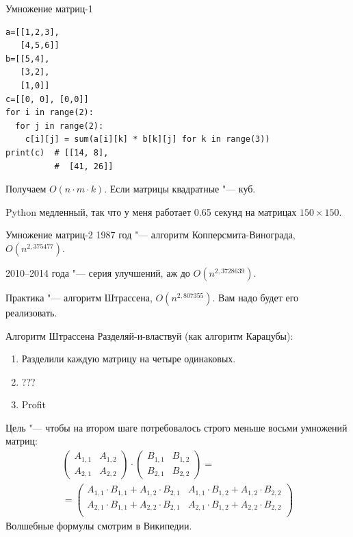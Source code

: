 \documentclass[utf8,xcolor=table]{beamer}
\begin{document}
\begin{frame}[t,fragile]{Умножение матриц-1}
\begin{verbatim}
a=[[1,2,3],
   [4,5,6]]
b=[[5,4],
   [3,2],
   [1,0]]
c=[[0, 0], [0,0]]
for i in range(2):
  for j in range(2):
    c[i][j] = sum(a[i][k] * b[k][j] for k in range(3))
print(c)  # [[14, 8],
          #  [41, 26]]
\end{verbatim}
	Получаем $O(n \cdot m \cdot k)$.
	Если матрицы квадратные "--- куб.

	Python медленный, так что у меня работает 0.65 секунд на матрицах $150 \times 150$.
\end{frame}

\begin{frame}[t]{Умножение матриц-2}
	1987 год "--- алгоритм Копперсмита-Винограда, $O(n^{2,375477})$.

	2010--2014 года "--- серия улучшений, аж до $O(n^{2,3728639})$.

	Практика "--- алгоритм Штрассена, $O(n^{2,807355})$.
	Вам надо будет его реализовать.
\end{frame}

\begin{frame}[t]{Алгоритм Штрассена}
	Разделяй-и-властвуй (как алгоритм Карацубы):
	\begin{enumerate}
		\item
			Разделили каждую матрицу на четыре одинаковых.
		\item
			???
		\item
			Profit
	\end{enumerate}

	Цель "--- чтобы на втором шаге потребовалось строго меньше восьми умножений матриц:
	\begin{gather*}
		\begin{pmatrix} A_{1,1} & A_{1,2} \\ A_{2,1} & A_{2,2} \end{pmatrix}
		\cdot
		\begin{pmatrix} B_{1,1} & B_{1,2} \\ B_{2,1} & B_{2,2} \end{pmatrix}
		= \\
		=
		\begin{pmatrix}
			A_{1,1}\cdot B_{1,1}+A_{1,2}\cdot B_{2,1} & A_{1,1} \cdot B_{1,2} + A_{1,2} \cdot B_{2,2} \\
			A_{2,1}\cdot B_{1,1}+A_{2,2}\cdot B_{2,1} & A_{2,1} \cdot B_{1,2} + A_{2,2} \cdot B_{2,2} \\
		\end{pmatrix}
	\end{gather*}
	Волшебные формулы смотрим в Википедии.
\end{frame}
\end{document}
